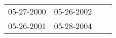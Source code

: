 \begin{supertabular}{llll}
 05-27-2000 &  05-26-2002 \\
 05-26-2001 &  05-28-2004 \\
\end{supertabular}
